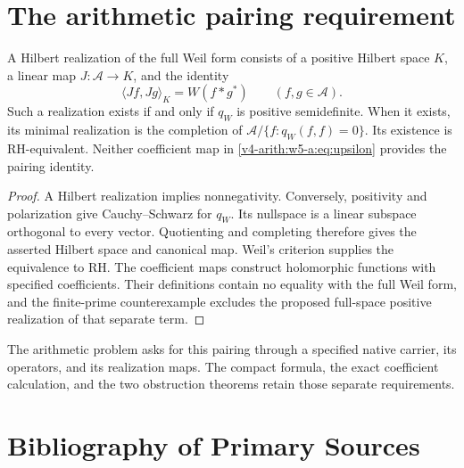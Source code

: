 \section{The arithmetic pairing requirement}
\label{v4-arith:w5-a:form}

\begin{theorem}
\label{v4-arith:w5-a:thm:hpli-form}
A Hilbert realization of the full Weil form consists of a positive
Hilbert space $K$, a linear map $J:\mathscr A\to K$, and the identity
\[
 \langle Jf,Jg\rangle_K=W(f*g^*)\qquad(f,g\in\mathscr A).
\]
Such a realization exists if and only if $q_W$ is positive semidefinite.
When it exists, its minimal realization is the completion of
$\mathscr A/\{f:q_W(f,f)=0\}$. Its existence is RH-equivalent.
Neither coefficient map in \eqref{v4-arith:w5-a:eq:upsilon}
provides the pairing identity.
\end{theorem}
\begin{proof}
A Hilbert realization implies nonnegativity. Conversely, positivity
and polarization give Cauchy--Schwarz for $q_W$. Its nullspace is a
linear subspace orthogonal to every vector. Quotienting and completing
therefore gives the asserted Hilbert space and canonical map.
Weil's criterion supplies the equivalence to RH. The coefficient
maps construct holomorphic functions with specified coefficients.
Their definitions contain no equality with the full Weil form, and
the finite-prime counterexample excludes the proposed full-space
positive realization of that separate term.
\end{proof}

The arithmetic problem asks for this pairing through a specified
native carrier, its operators, and its realization maps. The compact
formula, the exact coefficient calculation, and the two obstruction
theorems retain those separate requirements.



\section{Bibliography of Primary Sources}
\label{v4-arith:w5-a:bibliography}

